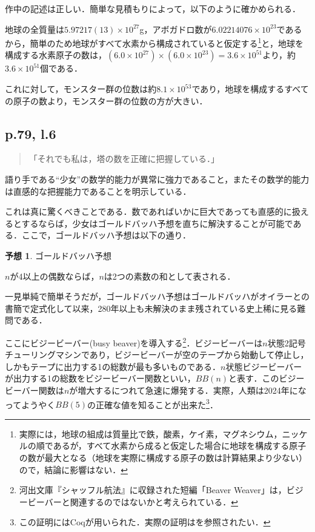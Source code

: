 \documentclass[10pt, a5paper, twoside]{jsarticle}
\theoremstyle{definition}
\newtheorem{hyp}{予想}
\begin{document}
			作中の記述は正しい．簡単な見積もりによって，以下のように確かめられる．

			地球の全質量は$5.97217(13) \times {10}^{27} $g\cite{pdg}，アボガドロ数が$6.02214076 \times {10}^{23}$である\cite{si}から，簡単のため地球がすべて水素から構成されていると仮定する\footnote{実際には，地球の組成は質量比で鉄，酸素，ケイ素，マグネシウム，ニッケルの順である\cite{ichi}が，すべて水素から成ると仮定した場合に地球を構成する原子の数が最大となる（地球を実際に構成する原子の数は計算結果より少ない）ので，結論に影響はない．}と，地球を構成する水素原子の数は，$(6.0 \times {10}^{27}) \times (6.0 \times {10}^{23}) = 3.6 \times {10}^{51}$より，約$3.6 \times {10}^{51}$個である．

			これに対して，モンスター群の位数は約$8.1 \times {10}^{53}$であり，地球を構成するすべての原子の数より，モンスター群の位数の方が大きい．

		\subsection{p.79, l.6}

			\begin{quote}

				「それでも私は，塔の数を正確に把握している．」
				
			\end{quote}

			語り手である“少女”の数学的能力が異常に強力であること，またその数学的能力は直感的な把握能力であることを明示している．

			これは真に驚くべきことである．数であればいかに巨大であっても直感的に扱えるとするならば，少女はゴールドバッハ予想を直ちに解決することが可能である．ここで，ゴールドバッハ予想は以下の通り．

			\begin{hyp}

				ゴールドバッハ予想

				$n$が4以上の偶数ならば，$n$は2つの素数の和として表される．
				
			\end{hyp}

			一見単純で簡単そうだが，ゴールドバッハ予想はゴールドバッハがオイラーとの書簡で定式化して以来，280年以上も未解決のまま残されている史上稀に見る難問である．

			ここにビジービーバー(busy beaver)を導入する\footnote{河出文庫『シャッフル航法』に収録された短編「Beaver Weaver」は，ビジービーバーと関連するのではないかと考えられている．}．ビジービーバーは$n$状態2記号チューリングマシンであり，ビジービーバーが空のテープから始動して停止し，しかもテープに出力する1の総数が最も多いものである．$n$状態ビジービーバーが出力する1の総数をビジービーバー関数といい，$BB(n)$と表す\cite{bbf}．このビジービーバー関数は$n$が増大するにつれて急速に爆発する．実際，人類は2024年になってようやく$BB(5)$の正確な値を知ることが出来た\footnote{この証明にはCoqが用いられた．実際の証明は\cite{bb5}を参照されたい．}．
\end{document}
